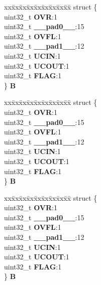 \begin{DoxyCompactItemize}
\begin{tabbing}
\end{tabbing}\item 
\mbox{\label{unionEMIOS__tag_1_1EMIOS__CH__tag_1_1EMIOS__CSR__tag_a5fa5c43ba3ab7f2a4bfb5bbb96c04e81}} 
\begin{tabbing}
xx\=xx\=xx\=xx\=xx\=xx\=xx\=xx\=xx\=\kill
struct \{\\
\>uint32\_t {\bfseries OVR}:1\\
\>uint32\_t {\bfseries \_\_pad0\_\_}:15\\
\>uint32\_t {\bfseries OVFL}:1\\
\>uint32\_t {\bfseries \_\_pad1\_\_}:12\\
\>uint32\_t {\bfseries UCIN}:1\\
\>uint32\_t {\bfseries UCOUT}:1\\
\>uint32\_t {\bfseries FLAG}:1\\
\} {\bfseries B}\\

\end{tabbing}\item 
\mbox{\label{unionEMIOS__tag_1_1EMIOS__CH__tag_1_1EMIOS__CSR__tag_a9a63a7b42a71bf022d9d3c6f558dac66}} 
\begin{tabbing}
xx\=xx\=xx\=xx\=xx\=xx\=xx\=xx\=xx\=\kill
struct \{\\
\>uint32\_t {\bfseries OVR}:1\\
\>uint32\_t {\bfseries \_\_pad0\_\_}:15\\
\>uint32\_t {\bfseries OVFL}:1\\
\>uint32\_t {\bfseries \_\_pad1\_\_}:12\\
\>uint32\_t {\bfseries UCIN}:1\\
\>uint32\_t {\bfseries UCOUT}:1\\
\>uint32\_t {\bfseries FLAG}:1\\
\} {\bfseries B}\\

\end{tabbing}\item 
\mbox{\label{unionEMIOS__tag_1_1EMIOS__CH__tag_1_1EMIOS__CSR__tag_af001d2232a689f8dc7c43083bc5d3c9e}} 
\begin{tabbing}
xx\=xx\=xx\=xx\=xx\=xx\=xx\=xx\=xx\=\kill
struct \{\\
\>uint32\_t {\bfseries OVR}:1\\
\>uint32\_t {\bfseries \_\_pad0\_\_}:15\\
\>uint32\_t {\bfseries OVFL}:1\\
\>uint32\_t {\bfseries \_\_pad1\_\_}:12\\
\>uint32\_t {\bfseries UCIN}:1\\
\>uint32\_t {\bfseries UCOUT}:1\\
\>uint32\_t {\bfseries FLAG}:1\\
\} {\bfseries B}\\


\end{tabbing}
\end{DoxyCompactItemize}
